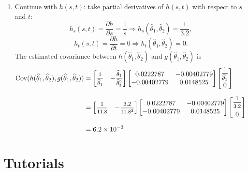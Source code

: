 \begin{solution}
\begin{enumerate}
        \item Continue with $h(s,t)$: take partial derivatives of $h(s,t)$ with respect to $s$ and $t$:
        \[
            h_s(s,t) = \frac{\partial h}{\partial s} = \frac{1}{s} \Longrightarrow h_s(\widehat{\theta}_1, \widehat{\theta}_2) = \frac{1}{3.2},
        \]
        \[
            h_t(s,t) = \frac{\partial h}{\partial t} = 0 \Longrightarrow h_t(\widehat{\theta}_1, \widehat{\theta}_2) = 0.
        \]
        The estimated covariance between $h(\widehat{\theta}_1, \widehat{\theta}_2)$ and $g(\widehat{\theta}_1, \widehat{\theta}_2)$ is
        \begin{align*}
            \cov(h(\widehat{\theta}_1, \widehat{\theta}_2), g(\widehat{\theta}_1, \widehat{\theta}_2)) &=
            \begin{bmatrix}
                \mfrac{1}{\widehat{\theta}_1} &
                -\mfrac{\widehat{\theta}_1}{\widehat{\theta}_2^2}
            \end{bmatrix}
            \begin{bmatrix}
                0.0222787 & -0.00402779 \\
                -0.00402779 & 0.0148525
            \end{bmatrix}
            \begin{bmatrix}
                \mfrac{1}{\widehat{\theta}_1} \\[0.6em]
                0
            \end{bmatrix}\\[0.6em]
            &= \begin{bmatrix}
                \mfrac{1}{11.8} &
                -\mfrac{3.2}{11.8^2}
            \end{bmatrix}
            \begin{bmatrix}
                0.0222787 & -0.00402779 \\
                -0.00402779 & 0.0148525
            \end{bmatrix}
            \begin{bmatrix}
                \mfrac{1}{3.2} \\[0.6em]
                0
            \end{bmatrix}\\[0.6em]
            &= 6.2 \times 10^{-3}
        \end{align*}
    \end{enumerate}
\end{solution}

\section*{Tutorials}

